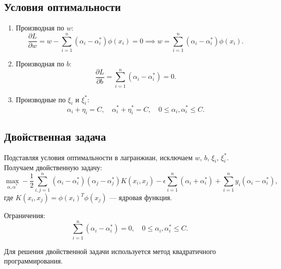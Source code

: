 \subsection{Условия оптимальности}
\begin{enumerate}
    \item Производная по \(w\):
          \begin{equation*}
              \frac{\partial L}{\partial w} = w - \sum_{i=1}^n (\alpha_i - \alpha_i^*) \phi(x_i) = 0 \implies
              w = \sum_{i=1}^n (\alpha_i - \alpha_i^*) \phi(x_i).
          \end{equation*}
    \item Производная по \(b\):
          \begin{equation*}
              \frac{\partial L}{\partial b} = \sum_{i=1}^n (\alpha_i - \alpha_i^*) = 0.
          \end{equation*}
    \item Производные по \(\xi_i\) и \(\xi_i^*\):
          \begin{equation*}
              \alpha_i + \eta_i = C, \quad \alpha_i^* + \eta_i^* = C, \quad 0 \leq \alpha_i, \alpha_i^* \leq C.
          \end{equation*}
\end{enumerate}

\subsection{Двойственная задача}
\par Подставляя условия оптимальности в лагранжиан, исключаем \(w\), \(b\), \(\xi_i\), \(\xi_i^*\). Получаем двойственную задачу:
\begin{equation*}
    \max_{\alpha, \alpha^*} -\frac{1}{2} \sum_{i,j=1}^n (\alpha_i - \alpha_i^*)(\alpha_j - \alpha_j^*) K(x_i, x_j)
    - \epsilon \sum_{i=1}^n (\alpha_i + \alpha_i^*) + \sum_{i=1}^n y_i (\alpha_i - \alpha_i^*),
\end{equation*}
где \(K(x_i, x_j) = \phi(x_i)^T \phi(x_j)\) — ядровая функция.
\par Ограничения:
\begin{equation*}
    \sum_{i=1}^n (\alpha_i - \alpha_i^*) = 0, \quad 0 \leq \alpha_i, \alpha_i^* \leq C.
\end{equation*}
\par Для решения двойственной задачи используется метод квадратичного программирования.


